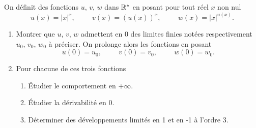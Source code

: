 On définit des fonctions $u$, $v$, $w$ dans $\mathbb{R}^{*}$ en posant pour tout réel $x$ non nul
\[
 u(x)=|x|^{x}, \hspace{1cm} v(x)=(u(x))^{x}, \hspace{1cm} w(x)=|x|^{u(x)}.
\]
\begin{enumerate}
\item Montrer que $u$, $v$, $w$ admettent en 0 des limites finies notées respectivement $u_{0}$, $v_{0}$, $w_{0}$ à préciser. On prolonge alors les fonctions en posant 
\[
 u(0)=u_{0}, \hspace{1cm} v(0)=v_{0}, \hspace{1cm} w(0)=w_{0}.
\]

\item Pour chacune de ces trois fonctions

\begin{enumerate}
\item  \'{E}tudier le comportement en $+\infty$.
\item \'{E}tudier la dérivabilité en 0.
\item Déterminer des développements limités en 1 et en -1 à l'ordre $3$.
\end{enumerate}
\end{enumerate}
